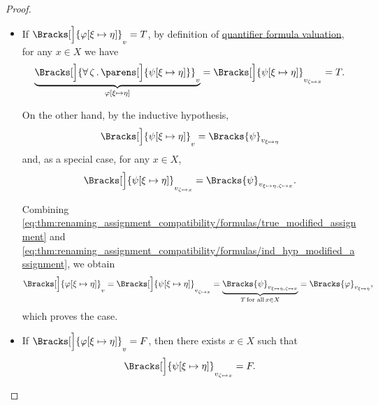\begin{proof}
\begin{itemize}
\begin{itemize}
      \begin{itemize}
        \item If \( \Bracks[\Big]{\varphi[\xi \mapsto \eta]}_v = T \), by definition of \hyperref[def:first_order_valuation/formula_valuation]{quantifier formula valuation}, for any \( x \in X \) we have
        \begin{equation}\label{eq:thm:renaming_assignment_compatibility/formulas/true_modified_assignment}
          \underbrace{\Bracks[\Big]{\qforall \zeta \parens[\Big]{ \psi[\xi \mapsto \eta] } }_v}_{\varphi[\xi \mapsto \eta]}
          =
          \Bracks[\Big]{\psi[\xi \mapsto \eta]}_{v_{\zeta \mapsto x}}
          =
          T.
        \end{equation}

        On the other hand, by the inductive hypothesis,
        \begin{equation*}
          \Bracks[\Big]{ \psi[\xi \mapsto \eta] }_v = \Bracks{\psi}_{v_{\xi \mapsto \eta}}
        \end{equation*}
        and, as a special case, for any \( x \in X \),
        \begin{equation}\label{eq:thm:renaming_assignment_compatibility/formulas/ind_hyp_modified_assignment}
          \Bracks[\Big]{ \psi[\xi \mapsto \eta] }_{v_{\zeta \mapsto x}} = \Bracks{\psi}_{v_{\xi \mapsto \eta, \zeta \mapsto x}}.
        \end{equation}

        Combining \eqref{eq:thm:renaming_assignment_compatibility/formulas/true_modified_assignment} and \eqref{eq:thm:renaming_assignment_compatibility/formulas/ind_hyp_modified_assignment}, we obtain
        \begin{equation*}
          \Bracks[\Big]{ \varphi[\xi \mapsto \eta] }_v
          =
          \Bracks[\Big]{ \psi[\xi \mapsto \eta] }_{v_{\zeta \mapsto x}}
          =
          \underbrace{\Bracks{\psi}_{v_{\xi \mapsto \eta, \zeta \mapsto x}}}_{T \T*{for all} x \in X}
          =
          \Bracks{\varphi}_{v_{\xi \mapsto \eta}},
        \end{equation*}
        which proves the case.

        \item If \( \Bracks[\Big]{\varphi[\xi \mapsto \eta]}_v = F \), then there exists \( x \in X \) such that
        \begin{equation*}
          \Bracks[\Big]{\psi[\xi \mapsto \eta]}_{v_{\zeta \mapsto x}} = F.
        \end{equation*}


\end{itemize}
\end{itemize}
\end{itemize}
\end{proof}
